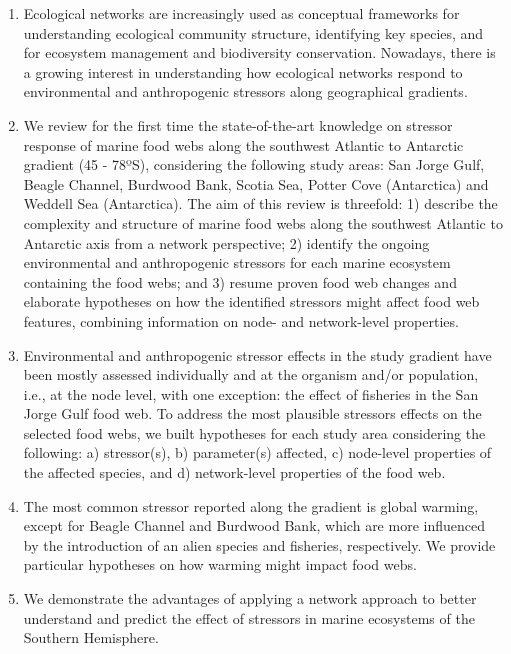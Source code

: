 \documentclass[
]{article}
\begin{document}
\begin{enumerate}
\def\labelenumi{\arabic{enumi}.}
\item
  Ecological networks are increasingly used as conceptual frameworks for
  understanding ecological community structure, identifying key species,
  and for ecosystem management and biodiversity conservation. Nowadays,
  there is a growing interest in understanding how ecological networks
  respond to environmental and anthropogenic stressors along
  geographical gradients.
\item
  We review for the first time the state-of-the-art knowledge on
  stressor response of marine food webs along the southwest Atlantic to
  Antarctic gradient (45 - 78ºS), considering the following study areas:
  San Jorge Gulf, Beagle Channel, Burdwood Bank, Scotia Sea, Potter Cove
  (Antarctica) and Weddell Sea (Antarctica). The aim of this review is
  threefold: 1) describe the complexity and structure of marine food
  webs along the southwest Atlantic to Antarctic axis from a network
  perspective; 2) identify the ongoing environmental and anthropogenic
  stressors for each marine ecosystem containing the food webs; and 3)
  resume proven food web changes and elaborate hypotheses on how the
  identified stressors might affect food web features, combining
  information on node- and network-level properties.
\item
  Environmental and anthropogenic stressor effects in the study gradient
  have been mostly assessed individually and at the organism and/or
  population, i.e., at the node level, with one exception: the effect of
  fisheries in the San Jorge Gulf food web. To address the most
  plausible stressors effects on the selected food webs, we built
  hypotheses for each study area considering the following: a)
  stressor(s), b) parameter(s) affected, c) node-level properties of the
  affected species, and d) network-level properties of the food web.
\item
  The most common stressor reported along the gradient is global
  warming, except for Beagle Channel and Burdwood Bank, which are more
  influenced by the introduction of an alien species and fisheries,
  respectively. We provide particular hypotheses on how warming might
  impact food webs.
\item
  We demonstrate the advantages of applying a network approach to better
  understand and predict the effect of stressors in marine ecosystems of
  the Southern Hemisphere.
\end{enumerate}
\end{document}
